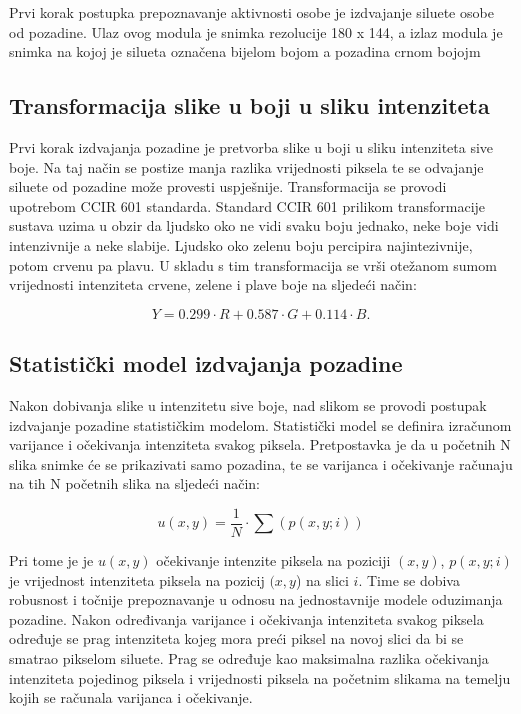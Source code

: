 \documentclass[times, utf8, diplomski]{fer}
\begin{document}
Prvi korak postupka prepoznavanje aktivnosti osobe je izdvajanje siluete osobe od pozadine. Ulaz ovog modula je snimka rezolucije 180 x 144, a izlaz modula je snimka na kojoj je silueta označena bijelom bojom a pozadina crnom bojojm

\subsection{Transformacija slike u boji u sliku intenziteta}

Prvi korak izdvajanja pozadine je pretvorba slike u boji u sliku intenziteta sive boje. Na taj način se postize manja razlika vrijednosti piksela te se odvajanje siluete od pozadine može provesti uspješnije. Transformacija se provodi upotrebom CCIR 601 standarda. Standard CCIR 601 prilikom transformacije sustava uzima u obzir da ljudsko oko ne vidi svaku boju jednako, neke boje vidi intenzivnije a neke slabije. Ljudsko oko zelenu boju percipira najintezivnije, potom crvenu pa plavu. U skladu s tim transformacija se vrši otežanom sumom vrijednosti intenziteta crvene, zelene i plave boje na sljedeći način:

\begin{equation}
Y = 0.299 \cdot R + 0.587 \cdot G + 0.114 \cdot B.
\end{equation}

\subsection{Statistički model izdvajanja pozadine}

Nakon dobivanja slike u intenzitetu sive boje, nad slikom se provodi postupak izdvajanje pozadine statističkim modelom. Statistički model se definira izračunom varijance i očekivanja intenziteta svakog piksela. Pretpostavka je da u početnih N slika snimke će se prikazivati samo pozadina, te se varijanca i očekivanje računaju na tih N početnih slika na sljedeći način:

\begin{equation}
u(x,y) = \frac{1}{N} \cdot  \sum (p(x,y;i))
\end{equation}

Pri tome je je $u(x,y)$ očekivanje intenzite piksela na poziciji $(x,y)$, $p(x,y;i)$ je vrijednost intenziteta piksela na pozicij $(x,y$) na slici $i$. Time se dobiva robusnost i točnije prepoznavanje u odnosu na jednostavnije modele oduzimanja pozadine. Nakon određivanja varijance i očekivanja intenziteta svakog piksela određuje se prag intenziteta kojeg mora preći piksel na novoj slici da bi se smatrao pikselom siluete. Prag se određuje kao maksimalna razlika očekivanja intenziteta pojedinog piksela i vrijednosti piksela na početnim slikama na temelju kojih se računala varijanca i očekivanje.
\end{document}
